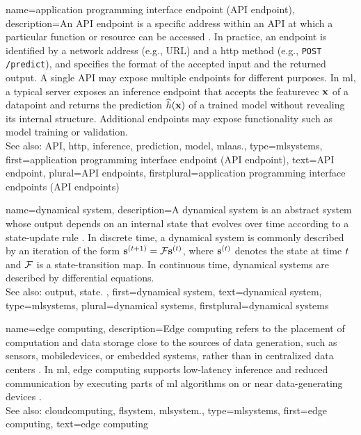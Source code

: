 {name={application programming interface endpoint (API endpoint)},
	description={An \gls{API} endpoint 
		is a specific address within an \gls{API} at which a particular function or resource can be accessed
		\cite{RestfulBook2013}.
		In practice, an endpoint is identified by a network address (e.g., URL) and a
		\gls{http} method (e.g., \texttt{POST /predict}), and specifies the format
		of the accepted input and the returned \gls{output}.
		A single \gls{API} may expose multiple endpoints for different purposes.
		In \gls{ml}, a typical server exposes an \gls{inference} endpoint
		that accepts the \gls{featurevec} ${\bf x}$ of a \gls{datapoint}
		and returns the \gls{prediction} $\widehat{h}({\bf x})$
		of a trained \gls{model} without revealing its internal structure.	
		Additional endpoints may expose functionality such as \gls{model} \gls{training}
		or \gls{validation}.
		\\
		See also: \gls{API}, \gls{http}, \gls{inference}, \gls{prediction}, \gls{model}, \gls{mlaas}.},
	type=mlsystems,
	first={application programming interface endpoint (API endpoint)},
	text={API endpoint},
	plural={API endpoints},
	firstplural={application programming interface endpoints (API endpoints)}
}

{name={dynamical system},
	description={A dynamical system is an abstract system whose 
		\gls{output} depends on an internal \gls{state} that evolves over time 
		according to a \gls{state}-update rule \cite{StrogatzBook}. In discrete time, 
		a dynamical system is commonly described by an \gls{iteration} of the form 
		${\bf s}^{(t+1)} =\mathcal{F} {\bf s}^{(t)}$, where ${\bf s}^{(t)}$ 
		denotes the \gls{state} at time $t$ and $\mathcal{F}$ is 
		a \gls{state}-transition \gls{map}. In continuous time, dynamical systems 
		are described by differential equations.
		\\
		See also: \gls{output}, \gls{state}. },
	first={dynamical system},
	text={dynamical system},
	type=mlsystems,
	plural={dynamical systems}, 
	firstplural={dynamical systems}
}

{name={edge computing},
	description={Edge computing refers to the placement of
		computation and \gls{data} storage close to the sources of \gls{data} generation,
		such as sensors, \glspl{mobiledevice}, or embedded systems, rather than in
		centralized \gls{data} centers \cite{Shi2016}. 
		In \gls{ml}, edge computing supports low-latency \gls{inference} and reduced
		communication by executing parts of \gls{ml} \glspl{algorithm} on or near
		\gls{data}-generating \glspl{device} \cite{Nguyen2019}. 
		\\
		See also: \gls{cloudcomputing}, \gls{flsystem}, \gls{mlsystem}.},
	type=mlsystems,
	first={edge computing},
	text={edge computing}
}

